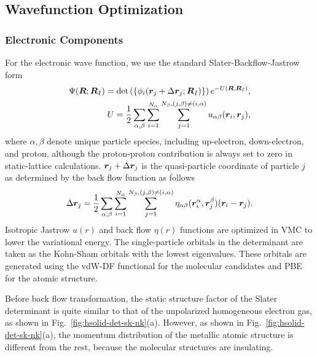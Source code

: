 \subsection{Wavefunction Optimization}

\subsubsection{Electronic Components}
For the electronic wave function, we use the standard Slater-Backflow-Jastrow form
\begin{align}
\Psi(\boldsymbol{R};\boldsymbol{R}_I) = \det\left( \{ \phi_i(\boldsymbol{r}_j+\Delta\boldsymbol{r}_j;\boldsymbol{R}_I)\} \right) e^{-U(\boldsymbol{R},\boldsymbol{R}_I)}, \\
U = \frac{1}{2}\sum\limits_{\alpha, \beta} \sum\limits_{i=1}^{N_\alpha} \sum\limits_{j=1}^{N_\beta, (j,\beta)\neq(i,\alpha)} u_{\alpha\beta}(\boldsymbol{r}_i, \boldsymbol{r}_j), \label{eq:hsolid-ujas}
\end{align}
where $\alpha, \beta$ denote unique particle species, including up-electron, down-electron, and proton, although the proton-proton contribution is always set to zero in static-lattice calculations. $\boldsymbol{r}_j+\Delta\boldsymbol{r}_j$ is the quasi-particle coordinate of particle $j$ as determined by the back flow function as follows
\begin{align}
\Delta \boldsymbol{r}_j = \frac{1}{2}\sum\limits_{\alpha, \beta} \sum\limits_{i=1}^{N_\alpha} \sum\limits_{j=1}^{N_\beta, (j,\beta)\neq(i,\alpha)} \eta_{\alpha\beta}(\boldsymbol{r}_i^\alpha, \boldsymbol{r}_j^\beta)(\boldsymbol{r}_i-\boldsymbol{r}_j).
\label{eq:hsolid-bf}
\end{align}
Isotropic Jastrow $u(r)$ and back flow $\eta(r)$ functions are optimized in VMC to lower the variational energy.
The single-particle orbitals in the determinant are taken as the Kohn-Sham orbitals with the lowest eigenvalues.
These orbitals are generated using the vdW-DF functional for the molecular candidates and PBE for the atomic structure.

Before back flow transformation, the static structure factor of the Slater determinant is quite similar to that of the unpolarized homogeneous electron gas, as shown in Fig.~\ref{fig:hsolid-det-sk-nk}(a). However, as shown in  Fig.~\ref{fig:hsolid-det-sk-nk}(a), the momentum distribution of the metallic atomic structure is different from the rest, because the molecular structures are insulating.


